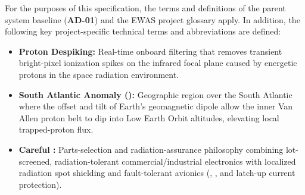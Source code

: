 For the purposes of this specification, the terms and definitions of the parent system baseline (\textbf{AD-01}) and the EWAS project glossary apply. In addition, the following key project-specific technical terms and abbreviations are defined:
\begin{itemize}
    \item \textbf{Proton Despiking:} Real-time onboard filtering that removes transient bright-pixel ionization spikes on the infrared focal plane caused by energetic protons in the space radiation environment.
    \item \textbf{South Atlantic Anomaly ():} Geographic region over the South Atlantic where the offset and tilt of Earth's geomagnetic dipole allow the inner Van Allen proton belt to dip into Low Earth Orbit altitudes, elevating local trapped-proton flux.
    \item \textbf{Careful :} Parts-selection and radiation-assurance philosophy combining lot-screened, radiation-tolerant commercial/industrial electronics with localized radiation spot shielding and fault-tolerant avionics (, , and latch-up current protection).
\end{itemize}

